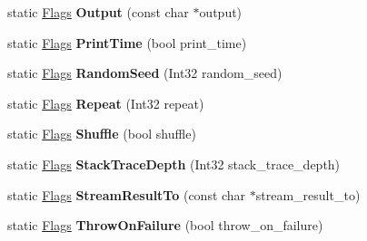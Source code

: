 \begin{DoxyCompactItemize}
static \mbox{\hyperlink{structtesting_1_1_flags}{Flags}} {\bfseries Output} (const char $\ast$output)
\item 
\mbox{\label{structtesting_1_1_flags_af4dc8454995fb3691399a049e95de179}} 
static \mbox{\hyperlink{structtesting_1_1_flags}{Flags}} {\bfseries Print\+Time} (bool print\+\_\+time)
\item 
\mbox{\label{structtesting_1_1_flags_a695cd8b8ab44df5eaa371bacded78c05}} 
static \mbox{\hyperlink{structtesting_1_1_flags}{Flags}} {\bfseries Random\+Seed} (Int32 random\+\_\+seed)
\item 
\mbox{\label{structtesting_1_1_flags_a19d47e87d77a18ef4fa8a85b74e25956}} 
static \mbox{\hyperlink{structtesting_1_1_flags}{Flags}} {\bfseries Repeat} (Int32 repeat)
\item 
\mbox{\label{structtesting_1_1_flags_a19ddbbaed61bda44a1940333b7c5a469}} 
static \mbox{\hyperlink{structtesting_1_1_flags}{Flags}} {\bfseries Shuffle} (bool shuffle)
\item 
\mbox{\label{structtesting_1_1_flags_a16b01d8bcceaa9fa8211fd24faa75b5a}} 
static \mbox{\hyperlink{structtesting_1_1_flags}{Flags}} {\bfseries Stack\+Trace\+Depth} (Int32 stack\+\_\+trace\+\_\+depth)
\item 
\mbox{\label{structtesting_1_1_flags_a9cf0f64310b28eadbbfbb35584ebfc71}} 
static \mbox{\hyperlink{structtesting_1_1_flags}{Flags}} {\bfseries Stream\+Result\+To} (const char $\ast$stream\+\_\+result\+\_\+to)
\item 
\mbox{\label{structtesting_1_1_flags_ad856df862414ed0dadf80b5e03829cc7}} 
static \mbox{\hyperlink{structtesting_1_1_flags}{Flags}} {\bfseries Throw\+On\+Failure} (bool throw\+\_\+on\+\_\+failure)
\end{DoxyCompactItemize}
